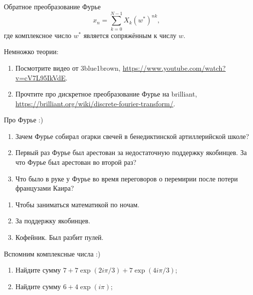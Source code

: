 Обратное преобразование Фурье
\[
  x_n = \sum_{k=0}^{N-1} X_k (w^{*})^{nk}, 
\]
где комплексное число $w^{*}$ является сопряжённым к числу $w$.


\begin{problem}
  Немножко теории:
  \begin{enumerate}
    \item Посмотрите видео от 3blue1brown, \url{https://www.youtube.com/watch?v=cV7L95IkVdE}.
    \item Прочтите про дискретное преобразование Фурье на brilliant, \url{https://brilliant.org/wiki/discrete-fourier-transform/}.
  \end{enumerate}
\begin{sol}
\end{sol}
\end{problem}



\begin{problem}
  Про Фурье :)
  \begin{enumerate}
    \item Зачем Фурье собирал огарки свечей в бенедиктинской артиллерийской школе?
    \item Первый раз Фурье был арестован за недостаточную поддержку якобинцев. За что Фурье был арестован во второй раз?
    \item Что было в руке у Фурье во время переговоров о перемирии после потери французами Каира?
  \end{enumerate}
  \begin{sol}
    \begin{enumerate}
      \item Чтобы заниматься математикой по ночам.
      \item За поддержку якобинцев.
      \item Кофейник. Был разбит пулей.
    \end{enumerate}
\end{sol}
\end{problem}


\begin{problem}
  Вспомним комплексные числа :)
  \begin{enumerate}
    \item Найдите сумму $7 + 7 \exp(2i\pi/3) + 7 \exp(4i\pi/3)$;
    \item Найдите сумму $6 + 4\exp(i\pi)$;
  \end{enumerate}

  \begin{sol}
  \end{sol}
\end{problem}


